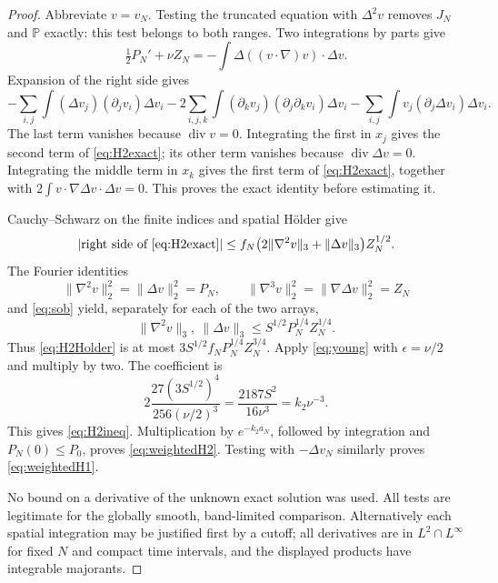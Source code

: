 \documentclass[11pt,a4paper]{article}
\theoremstyle{definition}\newtheorem{definition}[theorem]{Definition}
\theoremstyle{remark}\newtheorem{remark}[theorem]{Remark}
\newcommand{\PP}{\mathbb P}
\newcommand{\norm}[1]{\lVert #1\rVert}
\newcommand{\diver}{\operatorname{div}}
\numberwithin{equation}{section}
\begin{document}
\begin{proof}
Abbreviate $v=v_N$. Testing the truncated equation with $\Delta^2v$ removes $J_N$ and $\PP$ exactly: this test belongs to both ranges. Two integrations by parts give
\[
 \tfrac12P_N'+\nu Z_N=-\int\Delta((v\cdot\nabla)v)\cdot\Delta v.
\]
Expansion of the right side gives
\[
 -\sum_{i,j}\int (\Delta v_j)(\partial_jv_i)\Delta v_i
 -2\sum_{i,j,k}\int (\partial_kv_j)(\partial_j\partial_kv_i)\Delta v_i
 -\sum_{i,j}\int v_j(\partial_j\Delta v_i)\Delta v_i.
\]
The last term vanishes because $\diver v=0$. Integrating the first in $x_j$ gives the second term of \eqref{eq:H2exact}; its other term vanishes because $\diver\Delta v=0$. Integrating the middle term in $x_k$ gives the first term of \eqref{eq:H2exact}, together with $2\int v\cdot\nabla\Delta v\cdot\Delta v=0$. This proves the exact identity before estimating it.

Cauchy--Schwarz on the finite indices and spatial H\"older give
\begin{equation}\label{eq:H2Holder}
 \left|\text{right side of \eqref{eq:H2exact}}\right|
 \le f_N\bigl(2\norm{\nabla^2v}_3+\norm{\Delta v}_3\bigr)Z_N^{1/2}.
\end{equation}
The Fourier identities
\[
 \norm{\nabla^2v}_2^2=\norm{\Delta v}_2^2=P_N,
 \qquad\norm{\nabla^3v}_2^2=\norm{\nabla\Delta v}_2^2=Z_N
\]
and \eqref{eq:sob} yield, separately for each of the two arrays,
\[
 \norm{\nabla^2v}_3,\ \norm{\Delta v}_3
 \le S^{1/2}P_N^{1/4}Z_N^{1/4}.
\]
Thus \eqref{eq:H2Holder} is at most $3S^{1/2}f_NP_N^{1/4}Z_N^{3/4}$. Apply \eqref{eq:young} with $\epsilon=\nu/2$ and multiply by two. The coefficient is
\[
 2\frac{27(3S^{1/2})^4}{256(\nu/2)^3}
 =\frac{2187S^2}{16\nu^3}=k_2\nu^{-3}.
\]
This gives \eqref{eq:H2ineq}. Multiplication by $e^{-k_2a_N}$, followed by integration and $P_N(0)\le P_0$, proves \eqref{eq:weightedH2}. Testing with $-\Delta v_N$ similarly proves \eqref{eq:weightedH1}.

No bound on a derivative of the unknown exact solution was used. All tests are legitimate for the globally smooth, band-limited comparison. Alternatively each spatial integration may be justified first by a cutoff; all derivatives are in $L^2\cap L^\infty$ for fixed $N$ and compact time intervals, and the displayed products have integrable majorants.
\end{proof}
\end{document}
